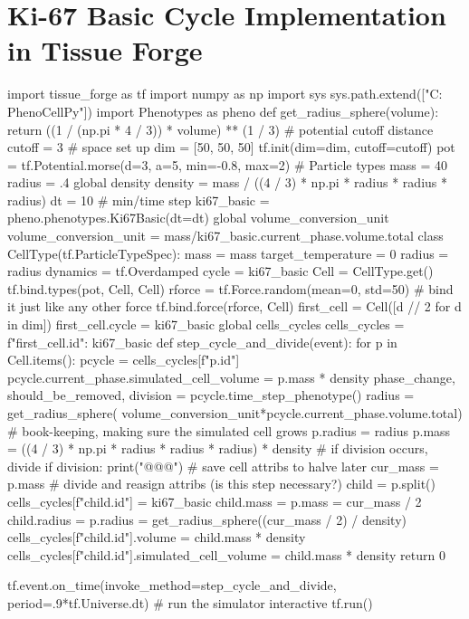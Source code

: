 \section{Ki-67 Basic Cycle Implementation in Tissue Forge}\label{suplemental:tf-ex:ki67}
\begin{python}
import tissue_forge as tf
import numpy as np
import sys
sys.path.extend(["C:\\PhenoCellPy"])
import Phenotypes as pheno
def get_radius_sphere(volume):
    return ((1 / (np.pi * 4 / 3)) * volume) ** (1 / 3)
# potential cutoff distance
cutoff = 3
# space set up
dim = [50, 50, 50]
tf.init(dim=dim, cutoff=cutoff)
pot = tf.Potential.morse(d=3, a=5, min=-0.8, max=2)
# Particle types
mass = 40
radius = .4
global density
density = mass / ((4 / 3) * np.pi * radius * radius * radius)
dt = 10  # min/time step
ki67_basic = pheno.phenotypes.Ki67Basic(dt=dt)
global volume_conversion_unit
volume_conversion_unit = mass/ki67_basic.current_phase.volume.total
class CellType(tf.ParticleTypeSpec):
    mass = mass
    target_temperature = 0
    radius = radius
    dynamics = tf.Overdamped
    cycle = ki67_basic
Cell = CellType.get()
tf.bind.types(pot, Cell, Cell)
rforce = tf.Force.random(mean=0, std=50)
# bind it just like any other force
tf.bind.force(rforce, Cell)
first_cell = Cell([d // 2 for d in dim])
first_cell.cycle = ki67_basic
global cells_cycles
cells_cycles = {f"{first_cell.id}": ki67_basic}
def step_cycle_and_divide(event):
    for p in Cell.items():
        pcycle = cells_cycles[f"{p.id}"]
        pcycle.current_phase.simulated_cell_volume = p.mass * density
        phase_change, should_be_removed, division = pcycle.time_step_phenotype()
        radius = get_radius_sphere(
                volume_conversion_unit*pcycle.current_phase.volume.total)
        # book-keeping, making sure the simulated cell grows
        p.radius = radius
        p.mass = ((4 / 3) * np.pi * radius * radius * radius) * density
        # if division occurs, divide
        if division:
            print("@@@\nDIVISION\n@@@")
            # save cell attribs to halve later
            cur_mass = p.mass
            # divide and reasign attribs (is this step necessary?)
            child = p.split()
            cells_cycles[f"{child.id}"] = ki67_basic
            child.mass = p.mass = cur_mass / 2
            child.radius = p.radius = get_radius_sphere((cur_mass / 2) / density)
            cells_cycles[f"{child.id}"].volume = child.mass * density
            cells_cycles[f"{child.id}"].simulated_cell_volume = child.mass * density
    return 0

tf.event.on_time(invoke_method=step_cycle_and_divide, period=.9*tf.Universe.dt)
# run the simulator interactive
tf.run()
\end{python}
